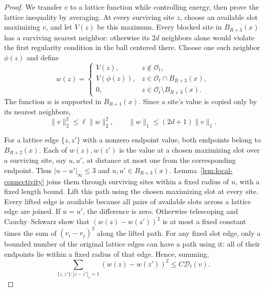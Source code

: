 \begin{proof}
We transfer \(v\) to a lattice function while controlling energy, then
prove the lattice inequality by averaging.  At every surviving site
\(z\), choose an available slot maximizing \(v\), and let \(V(z)\)
be this maximum.  Every blocked site in \(B_{R+3}(x)\) has a surviving
nearest neighbor: otherwise its \(2d\) neighbors alone would violate
the first regularity condition in the ball centered there.  Choose
one such neighbor \(\phi(z)\) and define
\[
 w(z)=
 \begin{cases}
   V(z),&z\notin\mathcal O_t,\\
   V(\phi(z)),&z\in\mathcal O_t\cap B_{R+3}(x),\\
   0,&z\in\mathcal O_t\setminus B_{R+3}(x).
 \end{cases}
\]
The function \(w\) is supported in \(B_{R+1}(x)\).  Since a site's
value is copied only by its nearest neighbors,
\begin{equation}\label{eq:nash-norm-transfer}
 \|v\|_2^2\le\ell\|w\|_2^2,
 \qquad \|w\|_1\le(2d+1)\|v\|_1.
\end{equation}

For a lattice edge \(\{z,z'\}\) with a nonzero endpoint value,
both endpoints belong to \(B_{R+2}(x)\).  Each of \(w(z),w(z')\)
is the value at a chosen maximizing slot over a surviving site,
say \(u,u'\), at distance at most one from the corresponding
endpoint.  Thus \(|u-u'|_\infty\le3\) and \(u,u'\in B_{R+3}(x)\).
Lemma~\ref{lem:local-connectivity} joins them through surviving sites
within a fixed radius of \(u\), with a fixed length bound.  Lift
this path using the chosen maximizing slot at every site.  Every
lifted edge is available because all pairs of available slots across
a lattice edge are joined.  If \(u=u'\), the difference is zero.
Otherwise telescoping and Cauchy--Schwarz show that
\((w(z)-w(z'))^2\) is at most a fixed constant times the sum of
\((v_i-v_j)^2\) along the lifted path.
For any fixed slot edge, only a bounded number of the original
lattice edges can have a path using it: all of their endpoints lie
within a fixed radius of that edge.  Hence, summing,
\begin{equation}\label{eq:nash-energy-transfer}
 \sum_{\{z,z'\}:|z-z'|_1=1}(w(z)-w(z'))^2
 \le C\mathcal D_t(v).
\end{equation}


\end{proof}
